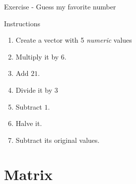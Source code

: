 \documentclass[10pt]{beamer}
\begin{document}

\begin{frame}{Exercise - Guess my favorite number}
  \begin{block}{Instructions}
    \begin{enumerate}
    \item Create a {\sf vector} with 5 {\it numeric} values
    \item Multiply it by $6$.
    \item Add $21$.
    \item Divide it by $3$ 
    \item Subtract $1$.
    \item Halve it.
    \item Subtract its original values.
    \end{enumerate}
  \end{block}
\end{frame}





\section{Matrix}
\end{document}
